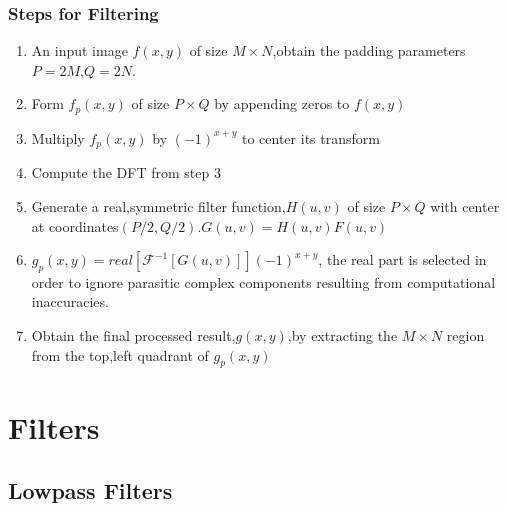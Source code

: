 \documentclass[notheorems, serif, table, compress]{beamer}  %
\begin{document}
\begin{frame}
\frametitle{Steps for Filtering}%

\begin{enumerate}

\item An input image $f(x,y)$ of size $M\times N$,obtain the padding parameters  $P=2M$,$Q=2N$.
\item Form $f_{p}(x,y)$ of size $P\times Q$ by appending zeros to $f(x,y)$
\item Multiply $f_{p}(x,y)$ by $(-1)^{x+y}$ to center its transform
\item Compute the DFT from step 3

\item Generate a real,symmetric filter function,$H(u,v)$ of size $P\times Q$ with center at coordinates$(P/2,Q/2)$.$G(u,v)=H(u,v)F(u,v)$

\item $g_{p}(x,y)={real[\mathscr{F}^{-1}[G(u,v)]]}(-1)^{x+y}$, the real part is selected in order to ignore parasitic complex components resulting from computational inaccuracies.
\item Obtain the final processed result,$g(x,y)$,by extracting the $M\times N$ region from the top,left quadrant of $g_{p}(x,y)$ 

\end{enumerate}

\end{frame}

\section{Filters}%

\subsection{Lowpass Filters}
\end{document}
